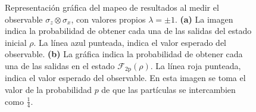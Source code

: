 \begin{figure}[H]
\caption{Representación gráfica del mapeo de resultados al medir el observable $\sigma_z\otimes \sigma_x$, con valores propios $\lambda=\pm 1$.\textbf{ (a)} La imagen indica la probabilidad de obtener cada una de las salidas del estado inicial $\rho$. La línea azul punteada, indica el valor esperado del observable.\textbf{ (b)} La gráfica indica la probabilidad de obtener cada una de las salidas en el estado $\mathcal{F}_{2\text{p}}(\rho)$. La línea roja punteada, indica el valor esperado del observable. En esta imagen se toma el valor de la probabilidad  $p$  de que las partículas se intercambien como $\frac{1}{4}$.}\label{valor-esperado-imagen}
\end{figure}


  
  